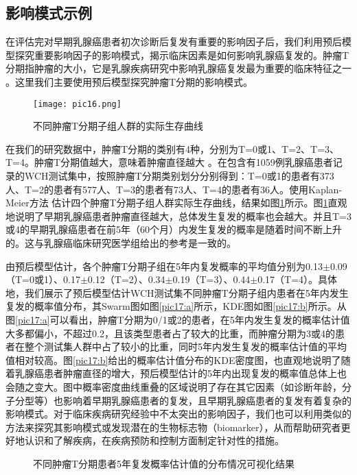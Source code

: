 \subsection{影响模式示例}

在评估完对早期乳腺癌患者初次诊断后复发有重要的影响因子后，我们利用预后模型探究重要影响因子的影响模式，揭示临床因素是如何影响乳腺癌复发的。肿瘤T分期指肿瘤的大小，它是乳腺疾病研究中影响乳腺癌复发最为重要的临床特征之一 。这里我们主要使用预后模型探究肿瘤T分期的影响模式。

\begin{figure}[H]
\texttt{[image: pic16.png]}
\caption{不同肿瘤T分期子组人群的实际生存曲线}
\label{pic16}
\end{figure}

在我们的研究数据中，肿瘤T分期的类别有4种，分别为T=0或1、T=2、T=3、T=4。肿瘤T分期值越大，意味着肿瘤直径越大 。在包含有1059例乳腺癌患者记录的WCH测试集中，按照肿瘤T分期类别划分分别得到：T=0或1的患者有373人、T=2的患者有577人、T=3的患者有73人、T=4的患者有36人。使用Kaplan-Meier方法 估计四个肿瘤T分期子组人群实际生存曲线，结果如图\ref{pic16}所示。图\ref{pic16}直观地说明了早期乳腺癌患者肿瘤直径越大，总体发生复发的概率也会越大。并且T=3或4的早期乳腺癌患者在前5年（60个月）内发生复发的概率是随着时间不断上升的。这与乳腺癌临床研究医学组给出的参考是一致的。

由预后模型估计，各个肿瘤T分期子组在5年内复发概率的平均值分别为0.13$\pm$0.09（T=0或1）、0.17$\pm$0.12（T=2）、0.34$\pm$0.19（T=3）、0.44$\pm$0.17（T=4）。具体地，我们展示了预后模型估计WCH测试集不同肿瘤T分期子组内患者在5年内发生复发的概率值分布，其Swarm图如图\ref{pic17:a}所示，KDE图如图\ref{pic17:b}所示。从图\ref{pic17:a}可以看出，肿瘤T分期为0/1或2的患者，在5年内发生复发的概率估计值大多都偏小，不超过0.2，且该类型患者占了较大的比重，而肿瘤分期为3或4的患者在整个测试集人群中占了较小的比重，同时5年内发生复发的概率估计值的平均值相对较高。图\ref{pic17:b}给出的概率估计值分布的KDE密度图，也直观地说明了随着乳腺癌患者肿瘤直径的增大，预后模型估计的5年内出现复发的概率值总体上也会随之变大。图中概率密度曲线重叠的区域说明了存在其它因素（如诊断年龄，分子分型等）也影响着早期乳腺癌患者的复发，且早期乳腺癌患者的复发有着复杂的影响模式。对于临床疾病研究经验中不太突出的影响因子，我们也可以利用类似的方法来探究其影响模式或发现潜在的生物标志物（biomarker），从而帮助研究者更好地认识和了解疾病，在疾病预防和控制方面制定针对性的措施。

\begin{figure}[h]
\centering 
{}
\hspace{0.01\linewidth}
\caption{不同肿瘤T分期患者5年复发概率估计值的分布情况可视化结果}
\label{pic17}
\end{figure}

